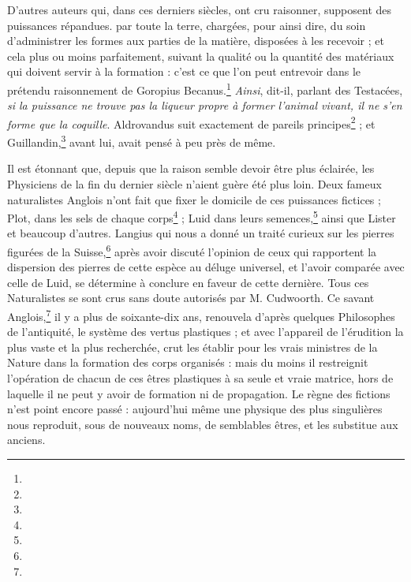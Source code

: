 \documentclass[a4paper, 11pt, oneside, polutonikogreek, french]{article}
\begin{document}
D'autres auteurs qui, dans ces derniers siècles, ont cru raisonner, supposent des puissances répandues. par toute la terre, chargées, pour ainsi dire, du soin d'administrer les formes aux parties de la matière, disposées à les recevoir ; et cela plus ou moins parfaitement, suivant la qualité ou la quantité des matériaux qui doivent servir à la formation : c'est ce que l'on peut entrevoir dans le prétendu raisonnement de Goropius Becanus.\footnote{} \emph{Ainsi}, dit-il, parlant des Testacées, \emph{si la puissance ne trouve pas la liqueur propre à former l'animal vivant, il ne s'en forme que la coquille}. Aldrovandus suit exactement de pareils principes\footnote{} ; et Guillandin,\footnote{} avant lui, avait pensé à peu près de même.

Il est étonnant que, depuis que la raison semble devoir être plus éclairée, les Physiciens de la fin du dernier siècle n'aient guère été plus loin. Deux fameux naturalistes Anglois n'ont fait que fixer le domicile de ces puissances fictices ; Plot, dans les sels de chaque corps\footnote{} ; Luid dans leurs semences,\footnote{} ainsi que Lister et beaucoup d'autres. Langius qui nous a donné un traité curieux sur les pierres figurées de la Suisse,\footnote{} après avoir discuté l'opinion de ceux qui rapportent la dispersion des pierres de cette espèce au déluge universel, et l'avoir comparée avec celle de Luid, se détermine à conclure en faveur de cette dernière. Tous ces Naturalistes se sont crus sans doute autorisés par M. Cudwoorth. Ce savant Anglois,\footnote{} il y a plus de soixante-dix ans, renouvela d'après quelques Philosophes de l'antiquité, le système des vertus plastiques ; et avec l'appareil de l'érudition la plus vaste et la plus recherchée, crut les établir pour les vrais ministres de la Nature dans la formation des corps organisés : mais du moins il restreignit l'opération de chacun de ces êtres plastiques à sa seule et vraie matrice, hors de laquelle il ne peut y avoir de formation ni de propagation. Le règne des fictions n'est point encore passé : aujourd'hui même une physique des plus singulières nous reproduit, sous de nouveaux noms, de semblables êtres, et les substitue aux anciens.
\end{document}

